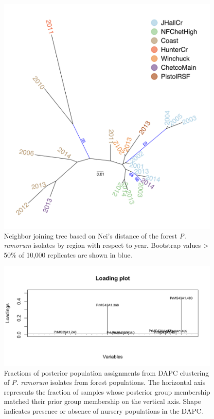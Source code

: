 \documentclass[double,12pt]{beavtex}
\begin{document}
  \begin{figure}
  
  {\centering \includegraphics[width=0.8\linewidth]{figure/phytopathology/figureS3} 
  
  }
  
  \caption[Neighbor joining tree based on Nei's distance of the forest \emph{P.
  ramorum} isolates by region with respect to year.]{Neighbor joining tree based on Nei's distance of the forest \emph{P.
  ramorum} isolates by region with respect to year. Bootstrap values
  \textgreater{} 50\% of 10,000 replicates are shown in blue.}\label{fig:ramS3}
  \end{figure}
  
  \begin{figure}
  
  {\centering \includegraphics[width=0.8\linewidth]{figure/phytopathology/figureS4} 
  
  }
  
  \caption[Fractions of posterior population assignments from DAPC clustering of
  \emph{P. ramorum} isolates from forest populations.]{Fractions of posterior population assignments from DAPC clustering of
  \emph{P. ramorum} isolates from forest populations. The horizontal axis
  represents the fraction of samples whose posterior group membership
  matched their prior group membership on the vertical axis. Shape
  indicates presence or absence of nursery populations in the DAPC.}\label{fig:ramS4}
  \end{figure}
  
\end{document}
